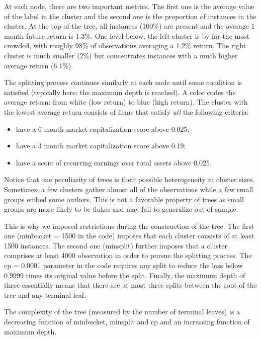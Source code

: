 \documentclass[]{krantz}
\providecommand{\tightlist}{%
  \setlength{\itemsep}{0pt}\setlength{\parskip}{0pt}}
\theoremstyle{definition}
\theoremstyle{definition}
\theoremstyle{definition}
\theoremstyle{remark}
\begin{document}
At each node, there are two important metrics. The first one is the
average value of the label in the cluster and the second one is the
proportion of instances in the cluster. At the top of the tree, all
instances (100\%) are present and the average 1 month future return is
1.3\%. One level below, the left cluster is by far the most crowded,
with roughly 98\% of observations averaging a 1.2\% return. The right
cluster is much smaller (2\%) but concentrates instances with a much
higher average return (6.1\%).

The splitting process continues similarly at each node until some
condition is satisfied (typically here: the maximum depth is reached). A
color codes the average return: from white (low return) to blue (high
return). The cluster with the lowest average return consists of firms
that satisfy \emph{all} the following criteria:

\begin{itemize}
\tightlist
\item
  have a 6 month market capitalization score above 0.025;\\
\item
  have a 3 month market capitalization score above 0.19;\\
\item
  have a score of recurring earnings over total assets above 0.025.
\end{itemize}

Notice that one peculiarity of trees is their possible heterogeneity in
cluster sizes. Sometimes, a few clusters gather almost all of the
observations while a few small groups embed some outliers. This is not a
favorable property of trees as small groups are more likely to be flukes
and may fail to generalize out-of-sample.

This is why we imposed restrictions during the construction of the tree.
The first one (minbucket = 1500 in the code) imposes that each cluster
consists of at least 1500 instances. The second one (minsplit) further
imposes that a cluster comprises at least 4000 observation in order to
pursue the splitting process. The cp = 0.0001 parameter in the code
requires any split to reduce the loss below 0.9999 times its original
value before the split. Finally, the maximum depth of three essentially
means that there are at most three splits between the root of the tree
and any terminal leaf.

The complexity of the tree (measured by the number of terminal leaves)
is a decreasing function of minbucket, minsplit and cp and an increasing
function of maximum depth.
\end{document}
